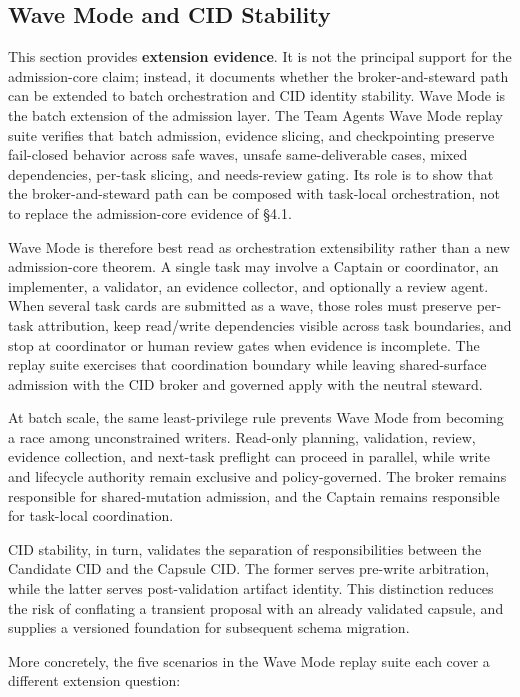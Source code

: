 \documentclass[9pt,letterpaper]{extarticle}
\begin{document}
\subsection{Wave Mode and CID Stability}

This section provides \textbf{extension evidence}. It is not the principal support for the admission-core claim; instead, it documents whether the broker-and-steward path can be extended to batch orchestration and CID identity stability. Wave Mode is the batch extension of the admission layer. The Team Agents Wave Mode replay suite verifies that batch admission, evidence slicing, and checkpointing preserve fail-closed behavior across safe waves, unsafe same-deliverable cases, mixed dependencies, per-task slicing, and needs-review gating. Its role is to show that the broker-and-steward path can be composed with task-local orchestration, not to replace the admission-core evidence of §4.1.

Wave Mode is therefore best read as orchestration extensibility rather than a new admission-core theorem. A single task may involve a Captain or coordinator, an implementer, a validator, an evidence collector, and optionally a review agent. When several task cards are submitted as a wave, those roles must preserve per-task attribution, keep read/write dependencies visible across task boundaries, and stop at coordinator or human review gates when evidence is incomplete. The replay suite exercises that coordination boundary while leaving shared-surface admission with the CID broker and governed apply with the neutral steward.

At batch scale, the same least-privilege rule prevents Wave Mode from becoming a race among unconstrained writers. Read-only planning, validation, review, evidence collection, and next-task preflight can proceed in parallel, while write and lifecycle authority remain exclusive and policy-governed. The broker remains responsible for shared-mutation admission, and the Captain remains responsible for task-local coordination.

CID stability, in turn, validates the separation of responsibilities between the Candidate CID and the Capsule CID. The former serves pre-write arbitration, while the latter serves post-validation artifact identity. This distinction reduces the risk of conflating a transient proposal with an already validated capsule, and supplies a versioned foundation for subsequent schema migration.

More concretely, the five scenarios in the Wave Mode replay suite each cover a different extension question:
\end{document}
